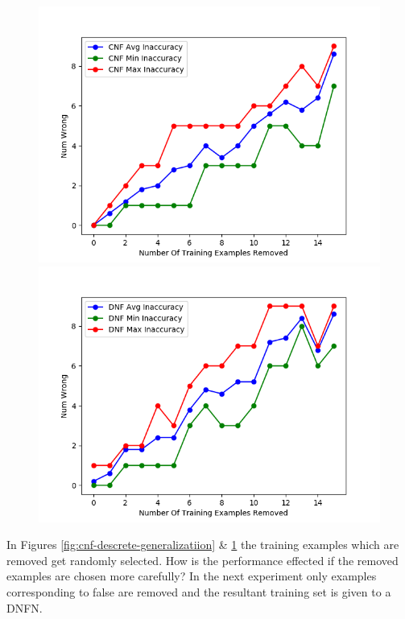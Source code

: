 \begin{figure}[H]
	\centering
	\begin{minipage}[b]{0.45\textwidth}
		\includegraphics[width=\textwidth]{cnf-descrete-generalization.png}
		\caption{}
		\label{fig:cnf-descrete-generalizatiion}
	\end{minipage}
	\begin{minipage}[b]{0.45\textwidth}
		\includegraphics[width=\textwidth]{dnf-descrete-generalization.png}
		\caption{}
		\label{fig:dnf-descrete-generalizatiion}
	\end{minipage}
	\hfill
\end{figure}

In Figures \ref{fig:cnf-descrete-generalizatiion} \& \ref{fig:dnf-descrete-generalizatiion} the training examples which are removed get randomly selected. How is the performance effected if the removed examples are chosen more carefully? In the next experiment only examples corresponding to false are removed and the resultant training set is given to a DNFN.

